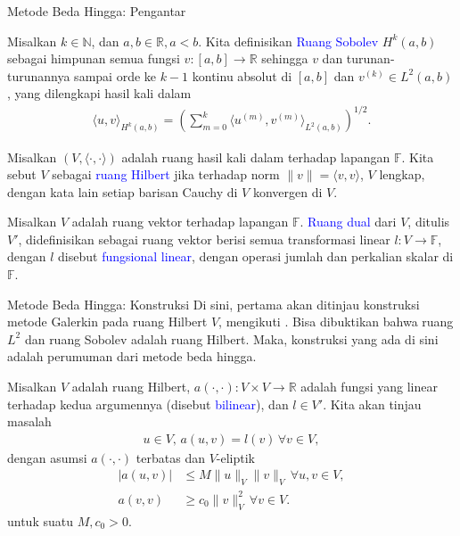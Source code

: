 \documentclass[xcolor={dvipsnames}, 9pt]{beamer}
\renewcommand{\emph}[1]{\textcolor{Blue}{#1}}
\begin{document}
	\begin{frame}{Metode Beda Hingga: Pengantar}
		\begin{definition}
			Misalkan $k\in\mathbb{N}$, dan $a,b\in\mathbb{R}, a<b$. Kita definisikan \emph{Ruang Sobolev} $H^k(a,b)$ sebagai himpunan semua fungsi $v:[a,b]\to\mathbb{R}$ sehingga $v$ dan turunan-turunannya sampai orde ke $k-1$ kontinu absolut di $[a,b]$ dan $v^{(k)}\in L^2(a,b)$, yang dilengkapi hasil kali dalam
			\begin{align*}
				\langle u,v\rangle_{H^k(a,b)} = \left(\sum_{m=0}^{k}\langle u^{(m)},v^{(m)}\rangle_{L^2(a,b)}\right)^{1/2}.
			\end{align*}
		\end{definition}
		\begin{definition}
			Misalkan $(V,\langle\cdot,\cdot\rangle)$ adalah ruang hasil kali dalam terhadap lapangan $\mathbb{F}$. Kita sebut $V$ sebagai \emph{ruang Hilbert} jika terhadap norm $\|v\|=\langle v,v\rangle$, $V$ lengkap, dengan kata lain setiap barisan Cauchy di $V$ konvergen di $V$.
		\end{definition}
		\begin{definition}
			Misalkan $V$ adalah ruang vektor terhadap lapangan $\mathbb{F}$. \emph{Ruang dual} dari $V$, ditulis $V'$, didefinisikan sebagai ruang vektor berisi semua transformasi linear $l:V\to\mathbb{F}$, dengan $l$ disebut \emph{fungsional linear}, dengan operasi jumlah dan perkalian skalar di $\mathbb{F}$.
		\end{definition}
	\end{frame}
	\begin{frame}{Metode Beda Hingga: Konstruksi}
		Di sini, pertama akan ditinjau konstruksi metode Galerkin pada ruang Hilbert $V$, mengikuti \cite{Han2009Theoretical}. Bisa dibuktikan bahwa ruang $L^2$ dan ruang Sobolev adalah ruang Hilbert. Maka, konstruksi yang ada di sini adalah perumuman dari metode beda hingga. \par
		Misalkan $V$ adalah ruang Hilbert, $a(\cdot,\cdot):V\times V\to \mathbb{R}$ adalah fungsi yang linear terhadap kedua argumennya (disebut \emph{bilinear}), dan $l\in V'$. Kita akan tinjau masalah
		\begin{align}\label{fdm_cons1}
			u\in V, \, a(u,v) = l(v) \, \forall v\in V,
		\end{align}
		dengan asumsi $a(\cdot,\cdot)$ terbatas dan $V$-eliptik
		\begin{align}
			|a(u,v)|&\leq M\|u\|_V\|v\|_V \, \forall u,v\in V, \label{fdm_cons2} \\
			a(v,v) &\geq c_0\|v\|_V^2 \, \forall v\in V. \label{fdm_cons3}
		\end{align}
		untuk suatu $M,c_0>0$.  
	\end{frame}
\end{document}
